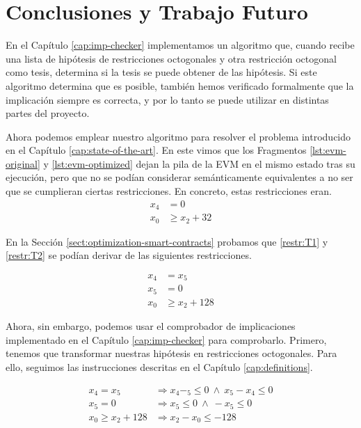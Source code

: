 \chapter*{Conclusiones y Trabajo Futuro}
\label{cap:conclusiones}

En el Capítulo \ref{cap:imp-checker} implementamos un algoritmo que, cuando recibe una
lista de hipótesis de restricciones octogonales y otra restricción octogonal como tesis,
determina si la tesis se puede obtener de las hipótesis. Si este algoritmo determina que
es posible, también hemos verificado formalmente que la implicación siempre es correcta,
y por lo tanto se puede utilizar en distintas partes del proyecto.

Ahora podemos emplear nuestro algoritmo para resolver el problema introducido en el
Capítulo \ref{cap:state-of-the-art}. En este vimos que los Fragmentos \ref{lst:evm-original} 
y \ref{lst:evm-optimized} dejan la pila de la EVM en el mismo estado tras su ejecución,
pero que no se podían considerar semánticamente equivalentes a no ser que se cumplieran
ciertas restricciones. En concreto, estas restricciones eran.
\begin{align}
    \label{restr:T1} x_4 &= 0 \\
    \label{restr:T2} x_0 &\ge x_2 + 32
\end{align}

En la Sección \ref{sect:optimization-smart-contracts} probamos que \ref{restr:T1} y 
\ref{restr:T2} se podían derivar de las siguientes restricciones.

\begin{align*}
    x_4 &= x_5 \\
    x_5 &= 0 \\
    x_0 &\ge x_2 + 128
\end{align*}

Ahora, sin embargo, podemos usar el comprobador de implicaciones implementado en
el Capítulo \ref{cap:imp-checker} para comprobarlo. Primero, tenemos que transformar
nuestras hipótesis en restricciones octogonales. Para ello, seguimos las instrucciones
descritas en el Capítulo \ref{cap:definitions}.

\begin{align*}
    x_4 = x_5 &\Longrightarrow x_4 - _5 \le 0 \ \wedge\  x_5 - x_4 \le 0
    \\
    x_5 = 0 &\Longrightarrow x_5 \le 0 \ \wedge\ -x_5 \le 0
    \\
    x_0 \ge x_2 + 128 &\Longrightarrow x_2 - x_0 \le -128
\end{align*}

